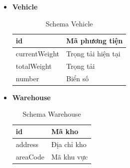 \begin{itemize}
		\item \textbf{Vehicle}
		
		\begin{table}[H]
			\centering\begin{tabular}{|l|m{30em}|}
				\hline 
				id & Mã phương tiện\\
				\hline 
				currentWeight & Trọng tải hiện tại\\
				\hline 
				totalWeight & Trọng tải\\
				\hline 
				number & Biển số\\
				\hline 
			\end{tabular}
			\caption{Schema Vehicle}
		\end{table}
	
	\newpage
	
		\item \textbf{Warehouse}
		
		\begin{table}[H]
			\centering\begin{tabular}{|l|m{30em}|}
				\hline 
				id & Mã kho\\
				\hline 
				address & Địa chỉ kho\\
				\hline 
				areaCode & Mã khu vực\\
				\hline 
			\end{tabular}
			\caption{Schema Warehouse}
		\end{table}


	\end{itemize}



	



	